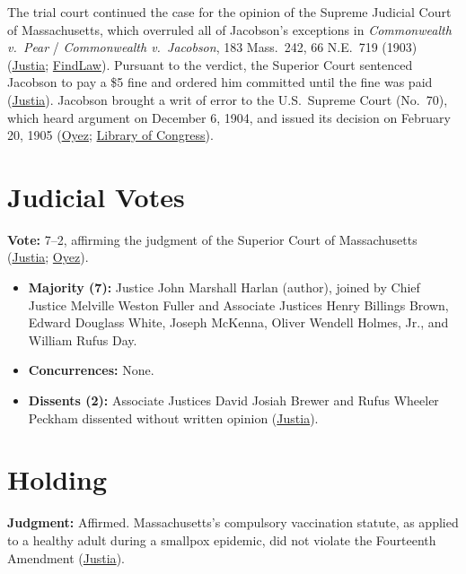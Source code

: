 \documentclass[12pt]{article}
\begin{document}
The trial court continued the case for the opinion of the Supreme Judicial Court of Massachusetts, which overruled all of Jacobson's exceptions in \textit{Commonwealth v.\ Pear} / \textit{Commonwealth v.\ Jacobson}, 183 Mass.\ 242, 66 N.E.\ 719 (1903) (\href{https://supreme.justia.com/cases/federal/us/197/11/}{Justia}; \href{https://caselaw.findlaw.com/court/us-supreme-court/197/11.html}{FindLaw}). Pursuant to the verdict, the Superior Court sentenced Jacobson to pay a \$5 fine and ordered him committed until the fine was paid (\href{https://supreme.justia.com/cases/federal/us/197/11/}{Justia}). Jacobson brought a writ of error to the U.S.\ Supreme Court (No.\ 70), which heard argument on December 6, 1904, and issued its decision on February 20, 1905 (\href{https://www.oyez.org/cases/1900-1940/197us11}{Oyez}; \href{https://tile.loc.gov/storage-services/service/ll/usrep/usrep197/usrep197011/usrep197011.pdf}{Library of Congress}).

\section{Judicial Votes}

\textbf{Vote:} 7--2, affirming the judgment of the Superior Court of Massachusetts (\href{https://supreme.justia.com/cases/federal/us/197/11/}{Justia}; \href{https://www.oyez.org/cases/1900-1940/197us11}{Oyez}).

\begin{itemize}
\item \textbf{Majority (7):} Justice John Marshall Harlan (author), joined by Chief Justice Melville Weston Fuller and Associate Justices Henry Billings Brown, Edward Douglass White, Joseph McKenna, Oliver Wendell Holmes, Jr., and William Rufus Day.
\item \textbf{Concurrences:} None.
\item \textbf{Dissents (2):} Associate Justices David Josiah Brewer and Rufus Wheeler Peckham dissented without written opinion (\href{https://supreme.justia.com/cases/federal/us/197/11/}{Justia}).
\end{itemize}

\section{Holding}

\textbf{Judgment:} Affirmed. Massachusetts's compulsory vaccination statute, as applied to a healthy adult during a smallpox epidemic, did not violate the Fourteenth Amendment (\href{https://supreme.justia.com/cases/federal/us/197/11/}{Justia}).
\end{document}
